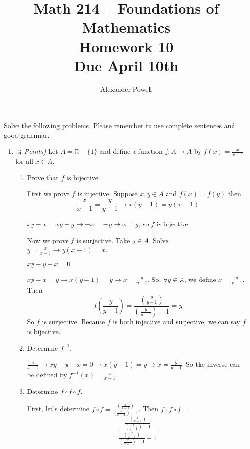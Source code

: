 \documentclass[10pt]{article} %
\title{Math 214 -- Foundations of Mathematics\\
Homework 10\\
{\large{\bf Due April 10th}}}
\date{}
\author{Alexander Powell}
\newcommand{\Z}{\mathbb{Z}}
\newcommand{\R}{\mathbb{R}}
\newcommand{\points}[1]{{\it (#1 Points)}}
\def\blue#1{\textcolor{blue}{#1}}
\begin{document}
\maketitle

Solve the following problems.  Please remember to use complete sentences
and good grammar.


\begin{enumerate}





\item\points{4} Let $A=\R-\{1\}$ and define a function $f: A\to A$ by $f(x)=\displaystyle\frac{x}{x-1}$ for all $x\in A$.
\begin{enumerate}
\item Prove that $f$ is bijective.

 First we prove $f$ is injective.  Suppose $x,y \in A$ and $f(x)=f(y)$ then $$\frac{x}{x-1}=\frac{y}{y-1} \rightarrow x(y-1)=y(x-1)$$

$xy-x=xy-y \rightarrow -x=-y \rightarrow x=y$, so $f$ is injective.  

Now we prove $f$ is surjective.  Take $y \in A$.  Solve $y=\frac{x}{x-1} \rightarrow y(x-1)=x$.  

$xy-y-x=0$

$xy-x=y \rightarrow x(y-1)=y \rightarrow x = \frac{y}{y-1}$.  So. $\forall y \in A$, we define $x = \frac{y}{y-1}$.  Then $$f(\frac{y}{y-1}) = \frac{(\frac{y}{y-1})}{(\frac{y}{y-1})-1}=y$$  So $f$ is surjective.  Because $f$ is both injective and surjective, we can say $f$ is bijective.  
\item Determine $f^{-1}$.

 $\frac{x}{x-1} \rightarrow xy-y-x=0 \rightarrow x(y-1)=y \rightarrow x=\frac{y}{y-1}$.  So the inverse can be defined by $f^{-1}(x)=\frac{x}{x-1}$.  
\item  Determine $f\circ f\circ f$.

 First, let's determine $f\circ f = \displaystyle\frac{(\displaystyle\frac{x}{x-1})}{(\displaystyle\frac{x}{x-1}) -1}$.  Then $f\circ f\circ f$ =
$$\displaystyle\frac{\displaystyle\frac{(\displaystyle\frac{x}{x-1})}{(\displaystyle\frac{x}{x-1}) -1}}{\displaystyle\frac{(\displaystyle\frac{x}{x-1})}{(\displaystyle\frac{x}{x-1}) -1}-1}$$
\end{enumerate}



\end{enumerate}
\end{document}
